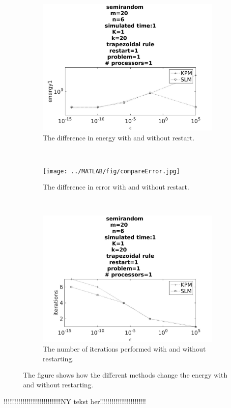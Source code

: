 \begin{figure}[H]
        \centering
        \begin{subfigure}[b]{0.3\textwidth}
                \includegraphics[width=\textwidth]{../MATLAB/fig/compareEnergy.jpg}
                \caption{ The difference in energy with and without restart. }
                \label{fig:compareEnergy}
        \end{subfigure}
        ~
        \begin{subfigure}[b]{0.3\textwidth}
                \texttt{[image: ../MATLAB/fig/compareError.jpg]}
                \caption{ The difference in error with and without restart. }
                \label{fig:compareEnergy}
        \end{subfigure}
        ~
        \begin{subfigure}[b]{0.3\textwidth}
                \includegraphics[width=\textwidth]{../MATLAB/fig/compareIter.jpg}
                \caption{ The number of iterations performed with and without restarting.  }
                \label{fig:compareIter}
        \end{subfigure}
        \caption{ The figure shows how the different methods change the energy with and without restarting.  }
        \label{fig:compare}
\end{figure}
!!!!!!!!!!!!!!!!!!!!!!!!!!!!!!NY tekst her!!!!!!!!!!!!!!!!!!!!!!!!\\

